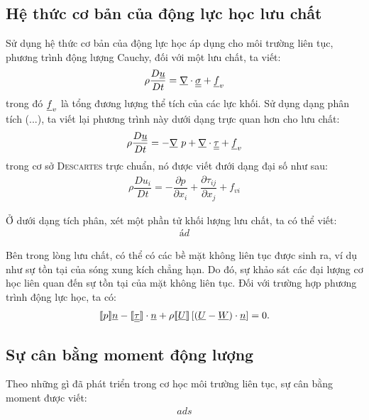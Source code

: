 \documentclass[CO_LUU_CHAT.tex]{subfiles}
\begin{document}
\subsection{Hệ thức cơ bản của động lực học lưu chất}
		
		Sử dụng hệ thức cơ bản của động lực học áp dụng cho môi trường liên tục, phương trình động lượng Cauchy, đối với một lưu chất, ta viết:
		\begin{align}
			\rho\dfrac{D\underline{u}}{Dt}=\underline{\nabla}\cdot\underline{\underline{\sigma}}+\underline{f}_{v}
		\end{align}
		trong đó $\underline{f}_{v}$ là tổng đương lượng thể tích của các lực khối. Sử dụng dạng phân tích (...), ta viết lại phương trình này dưới dạng trực quan hơn cho lưu chất:
		\begin{align}
			\rho\dfrac{D\underline{u}}{Dt}=-\underline{\nabla}\ p+\underline{\nabla}\cdot\underline{\underline{\tau}}+\underline{f}_{v}
		\end{align}
		trong cơ sở \textsc{Descartes} trực chuẩn, nó được viết đưới dạng đại số như sau:
		\begin{align}
			\rho\dfrac{Du_i}{Dt}=-\dfrac{\partial p}{\partial x_i}+\dfrac{\partial\tau_{ij}}{\partial x_j}+f_{vi}
		\end{align}
		
		Ở dưới dạng tích phân, xét một phần tử khối lượng lưu chất, ta có thể viết:
		\begin{align}
			ád
		\end{align}
		

		Bên trong lòng lưu chất, có thể có các bề mặt không liên tục được sinh ra, ví dụ như sự tồn tại của sóng xung kích chẳng hạn. Do đó, sự khảo sát các đại lượng cơ học liên quan đến sự tồn tại của mặt không liên tục. Đối với trường hợp phương trình động lực học, ta có:
		\begin{align}
			[\![ p ]\!]\underline{n}-[\![ \underline{\underline{\tau}} ]\!]\cdot\underline{n}+\rho[\![ \underline{U} ]\!]\left[\left(\underline{U}-\underline{W}\right)\cdot\underline{n}\right]=0.
		\end{align}
		
\subsection{Sự cân bằng moment động lượng}
		
		Theo những gì đã phát triển trong cơ học môi trường liên tục, sự cân bằng moment được viết:
		\begin{align}
			ads
		\end{align}
		
		
		
		
		
		
		
		
		
\end{document}
